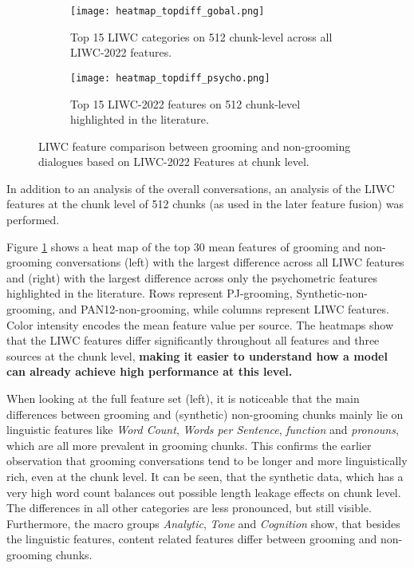 \begin{figure}[ht]
    \centering
    \begin{subfigure}[t]{0.49\textwidth}
        \centering
        \texttt{[image: heatmap\_topdiff\_gobal.png]}
        \caption{Top 15 LIWC categories on 512 chunk-level across all LIWC-2022 features.}
    \end{subfigure}
    \hfill
    \begin{subfigure}[t]{0.49\textwidth}
        \centering
        \texttt{[image: heatmap\_topdiff\_psycho.png]}
        \caption{Top 15 LIWC-2022 features on 512 chunk-level highlighted in the literature.}
    \end{subfigure}
    \caption[LIWC Feature Comparison at Chunk Level]{LIWC feature comparison between grooming and non-grooming dialogues based on LIWC-2022 Features at chunk level.}
    \label{fig:liwc_chunked_analysis}
\end{figure}

In addition to an analysis of the overall conversations, an analysis of the LIWC features at the chunk level of 512 chunks (as used in the later feature fusion) was performed. 

Figure \ref{fig:liwc_chunked_analysis} shows a heat map of the top 30 mean features of grooming and non-grooming conversations (left) with the largest difference across all LIWC features and (right) with the largest difference across only the psychometric features highlighted in the literature. Rows represent PJ-grooming, Synthetic-non-grooming, and PAN12-non-grooming, while columns represent LIWC features. Color intensity encodes the mean feature value per source. The heatmaps show that the LIWC features differ significantly throughout all features and three sources at the chunk level, \textbf{making it easier to understand how a model can already achieve high performance at this level.}

When looking at the full feature set (left), it is noticeable that the main differences between grooming and (synthetic) non-grooming chunks mainly lie on linguistic features like \textit{Word Count}, \textit{Words per Sentence}, \textit{function} and \textit{pronouns}, which are all more prevalent in grooming chunks. This confirms the earlier observation that grooming conversations tend to be longer and more linguistically rich, even at the chunk level. It can be seen, that the synthetic data, which has a very high word count balances out possible length leakage effects on chunk level. The differences in all other categories are less pronounced, but still visible. Furthermore, the macro groups \textit{Analytic}, \textit{Tone} and \textit{Cognition} show, that besides the linguistic features, content related features differ between grooming and non-grooming chunks.

